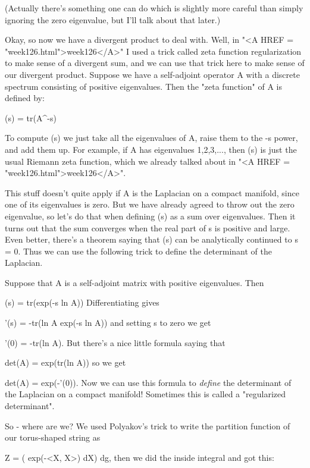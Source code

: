 (Actually there's something one can do which is slightly more careful
than simply ignoring the zero eigenvalue, but I'll talk about that later.)

Okay, so now we have a divergent product to deal with.  Well, in
"<A HREF = "week126.html">week126</A>" I used a trick called
zeta function regularization to make sense of a divergent sum, and we
can use that trick here to make sense of our divergent product.  Suppose
we have a self-adjoint operator A with a discrete spectrum consisting of
positive eigenvalues.  Then the "zeta function" of A is
defined by:

                      \zeta (s) = tr(A^{-s})

To compute \zeta (s) we just take all the eigenvalues of A, raise them to
the -s power, and add them up.   For example, if A has eigenvalues
1,2,3,..., then \zeta (s) is just the usual Riemann zeta function, which
we already talked about in "<A HREF = "week126.html">week126</A>".

This stuff doesn't quite apply if A is the Laplacian on a compact
manifold, since one of its eigenvalues is zero.  But we have already
agreed to throw out the zero eigenvalue, so let's do that when defining
\zeta (s) as a sum over eigenvalues.  Then it turns out that the sum
converges when the real part of s is positive and large.  Even better,
there's a theorem saying that \Zeta (s) can be analytically continued to 
s = 0.  Thus we can use the following trick to define the determinant of
the Laplacian.

Suppose that A is a self-adjoint matrix with positive eigenvalues.  Then

                    \zeta (s) = tr(exp(-s ln A))
Differentiating gives

                    \zeta '(s) = -tr(ln A exp(-s ln A))
and setting s to zero we get

                    \zeta '(0) = -tr(ln A).
But there's a nice little formula saying that

                    det(A) = exp(tr(ln A))
so we get

                    det(A) = exp(-\zeta '(0)).
Now we can use this formula to \emph{define} the determinant of the Laplacian
on a compact manifold!  Sometimes this is called a "regularized 
determinant".  

So - where are we?   We used Polyakov's trick to write the partition
function of our torus-shaped string as

            Z = \int  ( \int  exp(-<X, \Delta X>) dX) dg, 
then we did the inside integral and got this:

